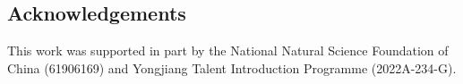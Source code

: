 \documentclass[a0,landscape]{a0poster}
\newcommand{\SAM}{\emph{$SA_M$}\xspace}
\begin{document}
\begin{multicols}{4}
%
%
%


\section*{Acknowledgements}
This work was supported in part by the National Natural Science Foundation of China (61906169) and Yongjiang Talent Introduction Programme (2022A-234-G).





\end{multicols}
\end{document}
